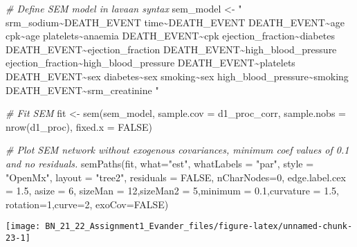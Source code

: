 \documentclass[
]{article}
\newenvironment{Shaded}{\begin{snugshade}}{\end{snugshade}}
\newcommand{\AttributeTok}[1]{\textcolor[rgb]{0.77,0.63,0.00}{#1}}
\newcommand{\CommentTok}[1]{\textcolor[rgb]{0.56,0.35,0.01}{\textit{#1}}}
\newcommand{\ConstantTok}[1]{\textcolor[rgb]{0.00,0.00,0.00}{#1}}
\newcommand{\DecValTok}[1]{\textcolor[rgb]{0.00,0.00,0.81}{#1}}
\newcommand{\FloatTok}[1]{\textcolor[rgb]{0.00,0.00,0.81}{#1}}
\newcommand{\FunctionTok}[1]{\textcolor[rgb]{0.00,0.00,0.00}{#1}}
\newcommand{\NormalTok}[1]{#1}
\newcommand{\OtherTok}[1]{\textcolor[rgb]{0.56,0.35,0.01}{#1}}
\newcommand{\StringTok}[1]{\textcolor[rgb]{0.31,0.60,0.02}{#1}}
\begin{document}
\begin{Shaded}
\begin{Highlighting}[]
\CommentTok{\# Define SEM model in lavaan syntax}
\NormalTok{sem\_model }\OtherTok{\textless{}{-}} \StringTok{"}
\StringTok{            srm\_sodium\textasciitilde{}DEATH\_EVENT}
\StringTok{            time\textasciitilde{}DEATH\_EVENT}
\StringTok{            DEATH\_EVENT\textasciitilde{}age}
\StringTok{            cpk\textasciitilde{}age}
\StringTok{            platelets\textasciitilde{}anaemia}
\StringTok{            DEATH\_EVENT\textasciitilde{}cpk}
\StringTok{            ejection\_fraction\textasciitilde{}diabetes}
\StringTok{            DEATH\_EVENT\textasciitilde{}ejection\_fraction}
\StringTok{            DEATH\_EVENT\textasciitilde{}high\_blood\_pressure}
\StringTok{            ejection\_fraction\textasciitilde{}high\_blood\_pressure}
\StringTok{            DEATH\_EVENT\textasciitilde{}platelets}
\StringTok{            DEATH\_EVENT\textasciitilde{}sex}
\StringTok{            diabetes\textasciitilde{}sex}
\StringTok{            smoking\textasciitilde{}sex}
\StringTok{            high\_blood\_pressure\textasciitilde{}smoking}
\StringTok{            DEATH\_EVENT\textasciitilde{}srm\_creatinine}
\StringTok{           "}

\CommentTok{\# Fit SEM}
\NormalTok{fit }\OtherTok{\textless{}{-}} \FunctionTok{sem}\NormalTok{(sem\_model, }\AttributeTok{sample.cov =}\NormalTok{ d1\_proc\_corr, }\AttributeTok{sample.nobs =} \FunctionTok{nrow}\NormalTok{(d1\_proc), }\AttributeTok{fixed.x =} \ConstantTok{FALSE}\NormalTok{)}

\CommentTok{\# Plot SEM network without exogenous covariances, minimum coef values of 0.1 and no residuals.}
\FunctionTok{semPaths}\NormalTok{(fit, }\AttributeTok{what=}\StringTok{"est"}\NormalTok{, }\AttributeTok{whatLabels =} \StringTok{"par"}\NormalTok{, }\AttributeTok{style =} \StringTok{"OpenMx"}\NormalTok{, }\AttributeTok{layout =} \StringTok{"tree2"}\NormalTok{,}
         \AttributeTok{residuals =} \ConstantTok{FALSE}\NormalTok{, }\AttributeTok{nCharNodes=}\DecValTok{0}\NormalTok{, }\AttributeTok{edge.label.cex =} \FloatTok{1.5}\NormalTok{, }\AttributeTok{asize =} \DecValTok{6}\NormalTok{,}
         \AttributeTok{sizeMan =} \DecValTok{12}\NormalTok{,}\AttributeTok{sizeMan2 =} \DecValTok{5}\NormalTok{,}\AttributeTok{minimum =} \FloatTok{0.1}\NormalTok{,}\AttributeTok{curvature =} \FloatTok{1.5}\NormalTok{,}
         \AttributeTok{rotation=}\DecValTok{1}\NormalTok{,}\AttributeTok{curve=}\DecValTok{2}\NormalTok{, }\AttributeTok{exoCov=}\ConstantTok{FALSE}\NormalTok{)}
\end{Highlighting}
\end{Shaded}

\begin{center}\texttt{[image: BN\_21\_22\_Assignment1\_Evander\_files/figure-latex/unnamed-chunk-23-1]} \end{center}
\end{document}
